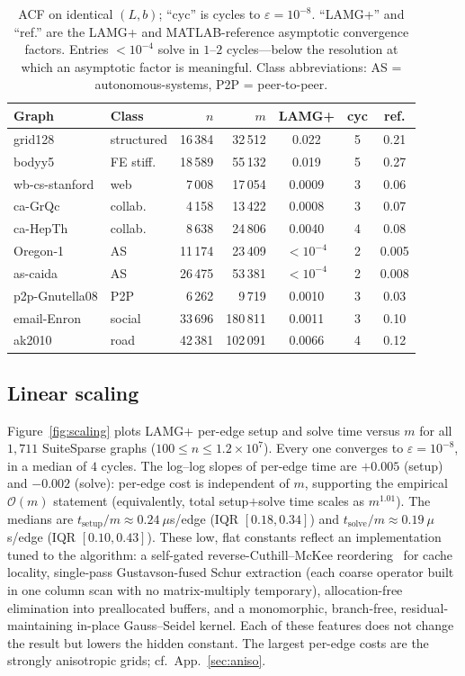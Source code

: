 \documentclass[leqno,letterpaper]{etna}
\newcommand{\Om}{\mathcal{O}(m)}
\begin{document}
\begin{table}[t]\centering\small
\caption{ACF on identical $(L,b)$; ``cyc'' is cycles to $\varepsilon=10^{-8}$.
``LAMG+'' and ``ref.'' are the LAMG+ and MATLAB-reference asymptotic convergence factors.
Entries $<10^{-4}$ solve in $1$--$2$ cycles---below the resolution at which an asymptotic
factor is meaningful. Class abbreviations: AS = autonomous-systems, P2P = peer-to-peer.}\label{tab:acf}
\begin{tabular}{llrrccc}
\toprule
Graph & Class & $n$ & $m$ & LAMG+ & cyc & ref.\\
\midrule
grid128        & structured  & 16\,384 & 32\,512  & 0.022      & 5 & 0.21\\
bodyy5         & FE stiff.   & 18\,589 & 55\,132  & 0.019      & 5 & 0.27\\
wb-cs-stanford & web         & 7\,008  & 17\,054  & 0.0009     & 3 & 0.06\\
ca-GrQc        & collab.     & 4\,158  & 13\,422  & 0.0008     & 3 & 0.07\\
ca-HepTh       & collab.     & 8\,638  & 24\,806  & 0.0040     & 4 & 0.08\\
Oregon-1       & AS          & 11\,174 & 23\,409  & $<10^{-4}$ & 2 & 0.005\\
as-caida       & AS          & 26\,475 & 53\,381  & $<10^{-4}$ & 2 & 0.008\\
p2p-Gnutella08 & P2P         & 6\,262  & 9\,719   & 0.0010     & 3 & 0.03\\
email-Enron    & social      & 33\,696 & 180\,811 & 0.0011     & 3 & 0.10\\
ak2010         & road        & 42\,381 & 102\,091 & 0.0066     & 4 & 0.12\\
\bottomrule
\end{tabular}
\end{table}

\subsection{Linear scaling}\label{sec:scaling}
Figure~\ref{fig:scaling} plots LAMG+ per-edge setup and solve time versus $m$ for all $1{,}711$
SuiteSparse graphs ($100\le n\le1.2\!\times\!10^7$). Every one converges to $\varepsilon=10^{-8}$, in a median of $4$ cycles. The log--log slopes of per-edge time are $+0.005$ (setup)
and $-0.002$ (solve): per-edge cost is independent of $m$, supporting the empirical $\Om$ statement
(equivalently, total setup$+$solve time scales as $m^{1.01}$). The medians are
$t_{\text{setup}}/m\approx0.24~\mu$s/edge (IQR $[0.18,0.34]$) and
$t_{\text{solve}}/m\approx0.19~\mu$s/edge (IQR $[0.10,0.43]$). These low, flat constants reflect an
implementation tuned to the algorithm: a self-gated reverse-Cuthill--McKee reordering~\cite{cuthill-mckee} for cache
locality, single-pass Gustavson-fused Schur extraction (each coarse operator built in one column scan
with no matrix-multiply temporary), allocation-free elimination into preallocated buffers, and a
monomorphic, branch-free, residual-maintaining in-place Gauss--Seidel kernel. Each of these features does not change the result but lowers the hidden constant.
The largest per-edge costs are the strongly anisotropic grids; cf.~App.~\ref{sec:aniso}.
\end{document}
